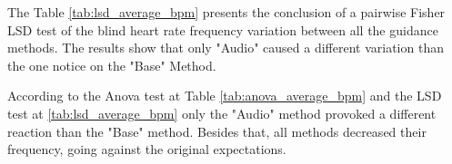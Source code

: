 

The Table \ref{tab:lsd_average_bpm} presents the conclusion of a pairwise Fisher LSD test of the blind heart rate frequency variation between all the guidance methods. The results show that only "Audio" caused a different variation than the one notice on the "Base" Method.



%
%
%
%
%
%
%
%
%
%
%    
%
%

According to the Anova test at Table \ref{tab:anova_average_bpm} and the LSD test at \ref{tab:lsd_average_bpm} only the "Audio" method provoked a different reaction than the "Base" method. Besides that, all methods decreased their frequency, going against the original expectations.

\FloatBarrier